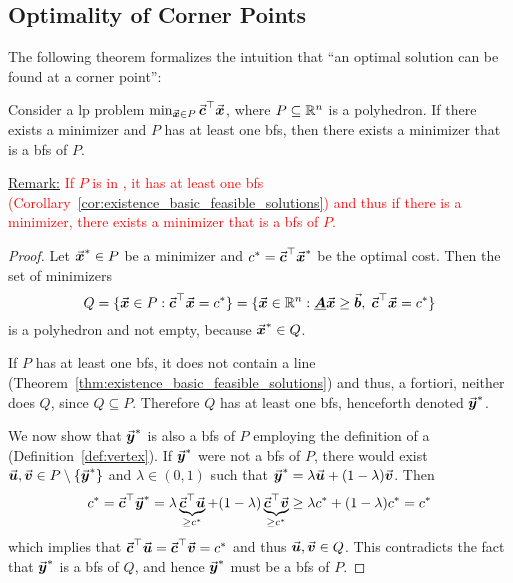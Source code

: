 \subsection{Optimality of Corner Points}\label{sec:optimality_corner_points_linear_programming}

The following theorem formalizes the intuition that ``an optimal solution can be found at a corner point'':

\begin{theorem}\label{thm:opt_extreme_point}
Consider a \gls{lp} problem \(\min_{\vec{\boldsymbol{x}}\in P} \vec{\boldsymbol{c}}^\top \vec{\boldsymbol{x}}\), where \(P\subseteq\mathbb{R}^{n}\) is a polyhedron.
If there exists a minimizer and \(P\) has at least one \gls{bfs},
then there exists a minimizer that is a \gls{bfs} of \(P\).
\end{theorem}

\underline{Remark:} \textcolor{red}{If \(P\) is in , it has at least one \gls{bfs} (Corollary~\ref{cor:existence_basic_feasible_solutions}) and thus if there is a minimizer, there exists a minimizer that is a \gls{bfs} of \(P\).}


\begin{proof}
Let \(\vec{\boldsymbol{x}}^\ast\in P\) be a minimizer and \(c^\ast=\vec{\boldsymbol{c}}^\top\vec{\boldsymbol{x}}^\ast\) be the optimal cost.
Then the set of minimizers
\[
  Q = \{\vec{\boldsymbol{x}}\in P : \vec{\boldsymbol{c}}^\top\vec{\boldsymbol{x}}=c^\ast \}
      = \{\vec{\boldsymbol{x}}\in\mathbb{R}^{n} : \underline{\boldsymbol{A}}\vec{\boldsymbol{x}}\ge \vec{\boldsymbol{b}},\;\vec{\boldsymbol{c}}^\top\vec{\boldsymbol{x}}=c^\ast\}
\]
is a polyhedron and not empty, because \(\vec{\boldsymbol{x}}^\ast\in Q\).

If \(P\) has at least one \gls{bfs}, it does not contain a line (Theorem~\ref{thm:existence_basic_feasible_solutions}) and thus, a fortiori, neither does \(Q\), since \(Q\subseteq P\).
Therefore \(Q\) has at least one \gls{bfs}, henceforth denoted \(\vec{\boldsymbol{y}}^\ast\).

We now show that \(\vec{\boldsymbol{y}}^\ast\) is also a \gls{bfs} of \(P\) employing the definition of a  (Definition~\ref{def:vertex}).
If \(\vec{\boldsymbol{y}}^\ast\) were not a \gls{bfs} of \(P\), there would exist \(\vec{\boldsymbol{u}},\vec{\boldsymbol{v}}\in P\setminus\{\vec{\boldsymbol{y}}^\ast\}\) and \(\lambda\in(0,1)\) such that \(\vec{\boldsymbol{y}}^\ast = \lambda\vec{\boldsymbol{u}} + (1-\lambda)\vec{\boldsymbol{v}}\).
Then
\[
  c^\ast = \vec{\boldsymbol{c}}^\top\vec{\boldsymbol{y}}^\ast = \lambda \underbrace{\vec{\boldsymbol{c}}^\top\vec{\boldsymbol{u}}}_{\geq c^\ast} + (1-\lambda)\underbrace{\vec{\boldsymbol{c}}^\top\vec{\boldsymbol{v}}}_{\geq c^\ast} \geq \lambda c^\ast + (1-\lambda)c^\ast = c^\ast
\]
which implies that \(\vec{\boldsymbol{c}}^\top\vec{\boldsymbol{u}} = \vec{\boldsymbol{c}}^\top\vec{\boldsymbol{v}} = c^\ast\) and thus \(\vec{\boldsymbol{u}},\vec{\boldsymbol{v}}\in Q\).
This contradicts the fact that \(\vec{\boldsymbol{y}}^\ast\) is a \gls{bfs} of \(Q\), and hence \(\vec{\boldsymbol{y}}^\ast\) must be a \gls{bfs} of \(P\).
\end{proof}

